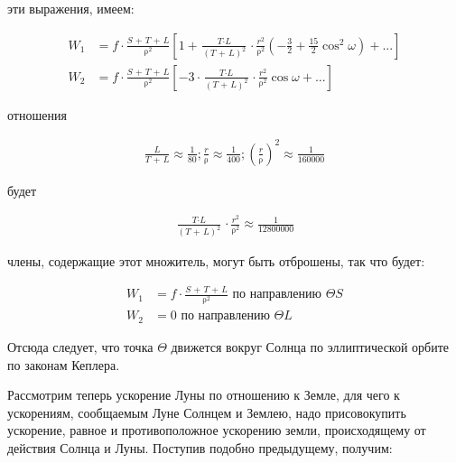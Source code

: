 \documentclass[a4paper,12pt]{article}
\begin{document}
 эти выражения, имеем:

\begin{equation*}
    \begin{aligned}
        \textit{W}_1 & = f \cdot \frac{\textit{S + T + L}}{\uprho^2} \left[1 + \frac{\textit{T}\cdot\textit{L}}{(\textit{T + L})^2} \cdot \frac{\textit{r}^2}{\uprho^2}\left(-\frac{3}{2} + \frac{15}{2} \cos^2\omega\right) + ...\right] \\
        \textit{W}_2 & = f \cdot \frac{\textit{S + T + L}}{\uprho^2} \left[-3 \cdot \frac{\textit{T}\cdot\textit{L}}{(\textit{T + L})^2} \cdot \frac{\textit{r}^2}{\uprho^2}\cos\omega + ...\right]
    \end{aligned}
\end{equation*}

 отношения

\begin{equation*}
    \begin{aligned}
        \frac{\textit{L}}{\textit{T + L}} \approx \frac{1}{80}; \frac{\textit{r}}{\uprho} \approx \frac{1}{400}; \left(\frac{\textit{r}}{\uprho}\right)^2 \approx \frac{1}{160000}
    \end{aligned}
\end{equation*}

 будет

\begin{equation*}
    \begin{aligned}
        \frac{\textit{T} \cdot \textit{L}}{(\textit{T + L})^2} \cdot \frac{r^2}{\uprho^2} \approx \frac{1}{12800000}
    \end{aligned}
\end{equation*}

 члены, содержащие этот множитель, могут быть отброшены, так что будет:

\begin{equation*}
    \begin{aligned}
        \textit{W}_1 & = f \cdot \frac{\textit{S + T + L}}{\uprho^2} \text{ по направлению } \Theta{\textit{S}} \\
        \textit{W}_2 & = 0 \text{ по направлению } \Theta{\textit{L}}
    \end{aligned}
\end{equation*}

Отсюда следует, что точка $\Theta$ движется вокруг Солнца по эллиптической орбите по законам Кеплера.

Рассмотрим теперь ускорение Луны по отношению к Земле, для чего к ускорениям, сообщаемым Луне Солнцем и Землею, надо присовокупить ускорение, равное и противоположное ускорению земли, происходящему от действия Солнца и Луны. Поступив подобно предыдущему, получим:
\end{document}

